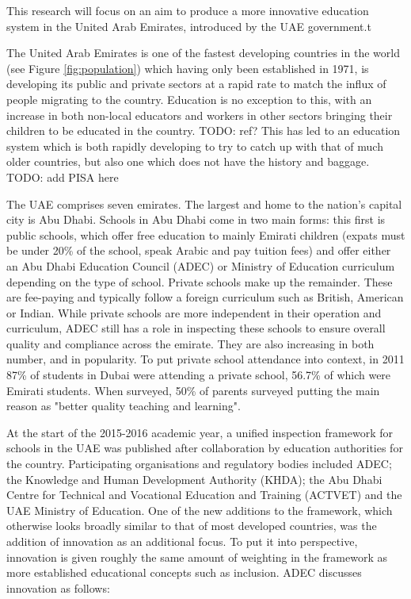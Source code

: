 This research will focus on an aim to produce a more innovative education system in the United Arab Emirates, introduced by the UAE government.t

The United Arab Emirates is one of the fastest developing countries in the world (see Figure \ref{fig:population}) which having only been established in 1971, is developing its public and private sectors at a rapid rate to match the influx of people migrating to the country. Education is no exception to this, with an increase in both non-local educators and workers in other sectors bringing their children to be educated in the country. TODO: ref? This has led to an education system which is both rapidly developing to try to catch up with that of much older countries, but also one which does not have the history and baggage. TODO: add PISA here

The UAE comprises seven emirates. The largest and home to the nation's capital city is Abu Dhabi. Schools in Abu Dhabi come in two main forms: this first is public schools, which offer free education to mainly Emirati children (expats must be under 20\% of the school, speak Arabic and pay tuition fees) and offer either an Abu Dhabi Education Council (ADEC) or Ministry of Education curriculum depending on the type of school. Private schools make up the remainder. These are fee-paying and typically follow a foreign curriculum such as British, American or Indian. While private schools are more independent in their operation and curriculum, ADEC still has a role in inspecting these schools to ensure overall quality and compliance across the emirate. They are also increasing in both number, and in popularity. To put private school attendance into context, in 2011 87\% of students in Dubai were attending a private school, 56.7\% of which were Emirati students. \cite[p.16]{Kenaid2011} When surveyed, 50\% of parents surveyed putting the main reason as "better quality teaching and learning". \cite[p.16]{Kenaid2011}

At the start of the 2015-2016 academic year, a unified inspection framework for schools in the UAE was published after collaboration by education authorities for the country. Participating organisations and regulatory bodies included ADEC; the Knowledge and Human Development Authority (KHDA); the Abu Dhabi Centre for Technical and Vocational Education and Training (ACTVET) and the UAE Ministry of Education. One of the new additions to the framework, which otherwise looks broadly similar to that of most developed countries, was the addition of innovation as an additional focus. To put it into perspective, innovation is given roughly the same amount of weighting in the framework as more established educational concepts such as inclusion. ADEC discusses innovation as follows:

